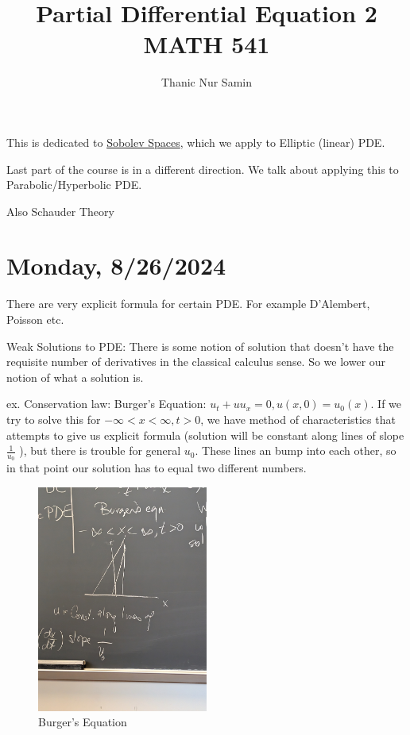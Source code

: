 \documentclass{article}
\title{Partial Differential Equation 2 MATH 541}
\author{Thanic Nur Samin}
\date{\vspace{-5ex}}
\theoremstyle{definition}
\begin{document}
\maketitle

This is dedicated to \underline{Sobolev Spaces}, which we apply to Elliptic (linear) PDE.

Last part of the course is in a different direction. We talk about applying this to Parabolic/Hyperbolic PDE.

Also Schauder Theory

\section*{Monday, 8/26/2024}

There are very explicit formula for certain PDE. For example D'Alembert, Poisson etc.

Weak Solutions to PDE: There is some notion of solution that doesn't have the requisite number of derivatives in the classical calculus sense. So we lower our notion of what a solution is.

ex. Conservation law: Burger's Equation: \(u_t + u u_x = 0, u(x,0)=u_0(x)\). If we try to solve this for \(-\infty < x < \infty , t > 0 \), we have method of characteristics that attempts to give us explicit formula (solution will be constant along lines of slope \(\frac{1}{u_0}\) ), but there is trouble for general \(u_0\). These lines an bump into each other, so in that point our solution has to equal two different numbers. 

\begin{figure}[H]
    \centering
    \includegraphics[width=0.5\textwidth]{img/PXL_20240826_154416711}
    \caption{Burger's Equation}
    \label{fig:burger}
\end{figure}    
\end{document}
